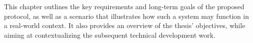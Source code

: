 This chapter outlines the key requirements and long-term goals of the proposed \pol{} protocol, as well as a scenario that illustrates how such a system may function in a real-world context. It also provides an overview of the thesis' objectives, while aiming at contextualizing the subsequent technical development work.